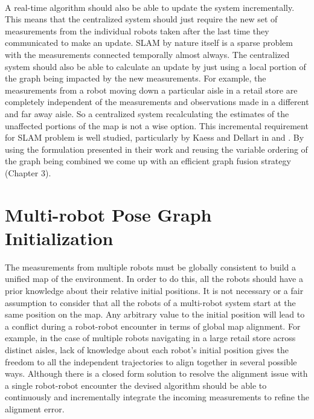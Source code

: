 \paragraph{}
A real-time algorithm should also be able to update the system incrementally. This means that the centralized system should just require the new set of measurements from the individual robots taken after the last time they communicated to make an update. SLAM by nature itself is a sparse problem with the measurements connected temporally almost always. The centralized system should also be able to calculate an update by just using a local portion of the graph being impacted by the new measurements. For example, the measurements from a robot moving down a particular aisle in a retail store are completely independent of the measurements and observations made in a different and far away aisle. So a centralized system recalculating the estimates of the unaffected portions of the map is not a wise option. This incremental requirement for SLAM problem is well studied, particularly by Kaess and Dellart in \cite{kaessisam} and \cite{kaessisam2}. By using the formulation presented in their work and reusing the variable ordering of the graph being combined we come up with an efficient graph fusion strategy (Chapter 3). 

\section{Multi-robot Pose Graph Initialization}
The measurements from multiple robots must be globally consistent to build a unified map of the environment. In order to do this, all the robots should have a prior knowledge about their relative initial positions. It is not necessary or a fair assumption to consider that all the robots of a multi-robot system start at the same position on the map. Any arbitrary value to the initial position will lead to a conflict during a robot-robot encounter in terms of global map alignment. For example, in the case of multiple robots navigating in a large retail store across distinct aisles, lack of knowledge about each robot's initial position gives the freedom to all the independent trajectories to align together in several possible ways. Although there is a closed form solution to resolve the alignment issue with a single robot-robot encounter \cite{zhoumulti} the devised algorithm should be able to continuously and incrementally integrate the incoming measurements to refine the alignment error. 

